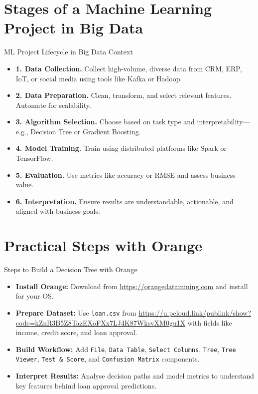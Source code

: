 \documentclass[aspectratio=169, table]{beamer}
\begin{document}
\section{Stages of a Machine Learning Project in Big Data}

\begin{frame}{ML Project Lifecycle in Big Data Context}
	\vspace{10pt}
	\begin{itemize}
		\item \textbf{1. Data Collection.} Collect high-volume, diverse data from CRM, ERP, IoT, or social media using tools like Kafka or Hadoop.
		\item \textbf{2. Data Preparation.} Clean, transform, and select relevant features. Automate for scalability.
		\item \textbf{3. Algorithm Selection.} Choose based on task type and interpretability—e.g., Decision Tree or Gradient Boosting.
		\item \textbf{4. Model Training.} Train using distributed platforms like Spark or TensorFlow.
		\item \textbf{5. Evaluation.} Use metrics like accuracy or RMSE and assess business value.
		\item \textbf{6. Interpretation.} Ensure results are understandable, actionable, and aligned with business goals.
	\end{itemize}
\end{frame}



\section{Practical Steps with Orange}

\begin{frame}{Steps to Build a Decision Tree with Orange}
	\vspace{10pt}
	\begin{itemize}
		\item \textbf{Install Orange:} Download from \url{https://orangedatamining.com} and install for your OS.
		
		\item \textbf{Prepare Dataset:} Use \texttt{loan.csv} from \url{https://u.pcloud.link/publink/show?code=kZnR3B5Z8TazEXoFXx7LJ4K87WksvXM0gu1X} with fields like income, credit score, and loan approval.
		
		\item \textbf{Build Workflow:} Add \texttt{File}, \texttt{Data Table}, \texttt{Select Columns}, \texttt{Tree}, \texttt{Tree Viewer}, \texttt{Test \& Score}, and \texttt{Confusion Matrix} components.
		
		\item \textbf{Interpret Results:} Analyse decision paths and model metrics to understand key features behind loan approval predictions.
	\end{itemize}
\end{frame}
\end{document}
